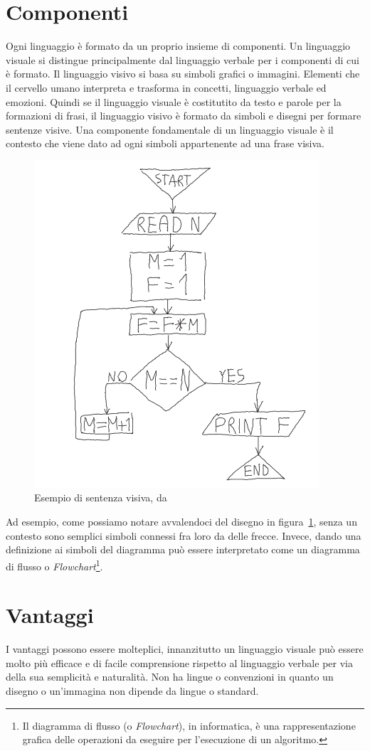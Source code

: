     \section{Componenti}
    Ogni linguaggio è formato da un proprio insieme di componenti. Un linguaggio visuale si distingue principalmente dal linguaggio verbale per i componenti di cui è formato. Il linguaggio visivo si basa su simboli grafici o immagini. Elementi che il cervello umano interpreta e trasforma in concetti, linguaggio verbale ed emozioni. Quindi se il linguaggio visuale è costitutito da testo e parole per la formazioni di frasi, il linguaggio visivo è formato da simboli e disegni per formare sentenze visive.
    Una componente fondamentale di un linguaggio visuale è il contesto che viene dato ad ogni simboli appartenente ad una frase visiva.
    \newline
    \begin{figure}[htbp]
        \centering
        \includegraphics[scale=0.6]{Figure/diagram.PNG}
        \caption{Esempio di sentenza visiva, da~\cite{localcontext_recognition}}
        \label{fig:diagram}
    \end{figure}
    \newline
    Ad esempio, come possiamo notare avvalendoci del disegno in figura~\ref{fig:diagram}, senza un contesto sono semplici simboli connessi fra loro da delle frecce. Invece, dando una definizione ai simboli del diagramma può essere interpretato come un diagramma di flusso o \textit{Flowchart}\footnote{Il diagramma di flusso (o \textit{Flowchart}), in informatica, è una rappresentazione grafica delle operazioni da eseguire per l'esecuzione di un algoritmo.}.

    \section{Vantaggi}
    I vantaggi possono essere molteplici, innanzitutto un linguaggio visuale può essere molto più efficace e di facile comprensione rispetto al linguaggio verbale per via della sua semplicità e naturalità. Non ha lingue o convenzioni in quanto un disegno o un'immagina non dipende da lingue o standard.